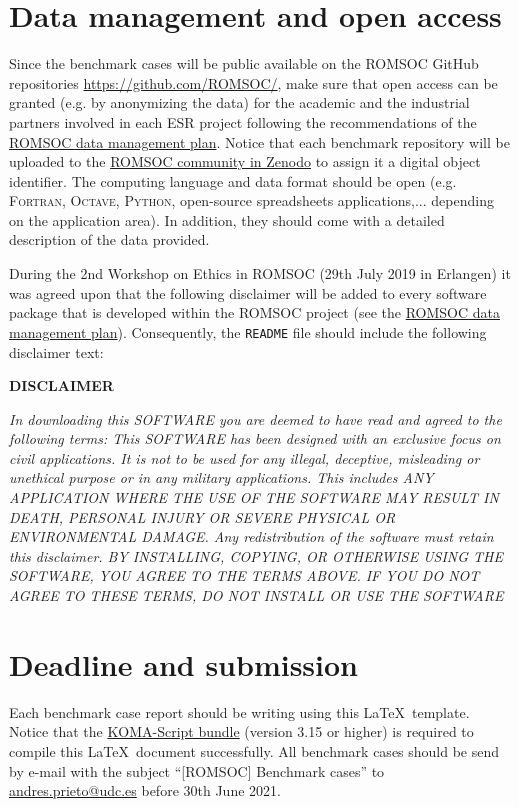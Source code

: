 \section{Data management and open access}
Since the benchmark cases will be public available on the ROMSOC GitHub repositories \url{https://github.com/ROMSOC/}, make sure that
open access can be granted (e.g. by anonymizing the data) for the academic and the industrial partners involved in each ESR project following the recommendations of the \href{http://doi.org/10.5281/zenodo.3459510}{ROMSOC data management plan}. Notice that each benchmark repository will be uploaded to the \href{https://zenodo.org/communities/romsoc}{ROMSOC community in Zenodo} to assign it a digital object identifier. The computing language and data format should
be open (e.g. \textsc{Fortran}, \textsc{Octave}, \textsc{Python}, open-source spreadsheets applications,... depending on the application area). In addition, they should come with a detailed description of the data provided.

During the 2nd Workshop on Ethics in ROMSOC (29th July 2019 in Erlangen) it was agreed upon that the following disclaimer will be added to every software package that is developed within the ROMSOC project (see the \href{http://doi.org/10.5281/zenodo.3459510}{ROMSOC data management plan}). Consequently, the \texttt{README} file should include the following disclaimer text:

\begin{center}
\textbf{DISCLAIMER}\\
\end{center}
\textit{In downloading this SOFTWARE you are deemed to have read and agreed to the following terms:
This SOFTWARE has been designed with an exclusive focus on civil applications. It is not to be used
for any illegal, deceptive, misleading or unethical purpose or in any military applications. This includes ANY APPLICATION WHERE THE USE OF THE SOFTWARE MAY RESULT IN DEATH,
PERSONAL INJURY OR SEVERE PHYSICAL OR ENVIRONMENTAL DAMAGE. Any redistribution of the software must retain this disclaimer. BY INSTALLING, COPYING, OR OTHERWISE
USING THE SOFTWARE, YOU AGREE TO THE TERMS ABOVE. IF YOU DO NOT AGREE TO
THESE TERMS, DO NOT INSTALL OR USE THE SOFTWARE}
  
\section{Deadline and submission}
Each benchmark case report should be writing using this \LaTeX ~template. Notice that the \href{https://ctan.org/pkg/koma-script?lang=en}{KOMA-Script bundle} (version 3.15 or higher) is required to compile this {\LaTeX}~document successfully. All benchmark cases should be send by e-mail with the subject ``[ROMSOC] Benchmark cases'' to
\href{mailto:andres.prieto@udc.es?subject=[ROMSOC] Software-based representations}{andres.prieto@udc.es} before 30th June 2021.
